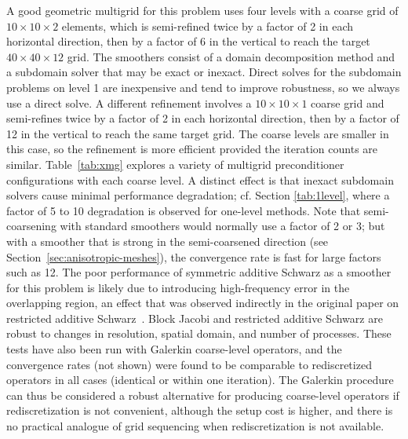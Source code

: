 A good geometric multigrid for this problem uses four levels with a coarse grid of $10\times 10\times 2$ elements, which is semi-refined twice by a factor of 2 in each horizontal direction, then by a factor of 6 in the vertical to reach the target $40\times 40\times 12$ grid.
The smoothers consist of a domain decomposition method and a subdomain solver that may be exact or inexact.
Direct solves for the subdomain problems on level 1 are inexpensive and tend to improve robustness, so we always use a direct solve.
A different refinement involves a $10\times 10\times 1$ coarse grid and semi-refines twice by a factor of 2 in each horizontal direction, then by a factor of 12 in the vertical to reach the same target grid.
The coarse levels are smaller in this case, so the refinement is more efficient provided the iteration counts are similar.
Table~\ref{tab:xmg} explores a variety of multigrid preconditioner configurations with each coarse level.
A distinct effect is that inexact subdomain solvers cause minimal performance degradation; cf. Section \ref{tab:1level}, where a factor of 5 to 10 degradation is observed for one-level methods.
Note that semi-coarsening with standard smoothers would normally use a factor of 2 or 3; but with a smoother that is strong in the semi-coarsened direction (see Section~\ref{sec:anisotropic-meshes}), the convergence rate is fast for large factors such as 12.
The poor performance of symmetric additive Schwarz as a smoother for this problem is likely due to introducing high-frequency error in the overlapping region, an effect that was observed indirectly in the original paper on restricted additive Schwarz~\cite{cai1999restricted}.
Block Jacobi and restricted additive Schwarz are robust to changes in resolution, spatial domain, and number of processes.
These tests have also been run with Galerkin coarse-level operators, and the convergence rates (not shown) were found to be comparable to rediscretized operators in all cases (identical or within one iteration).
The Galerkin procedure can thus be considered a robust alternative for producing coarse-level operators if rediscretization is not convenient, although the setup cost is higher, and there is no practical analogue of grid sequencing when rediscretization is not available.

